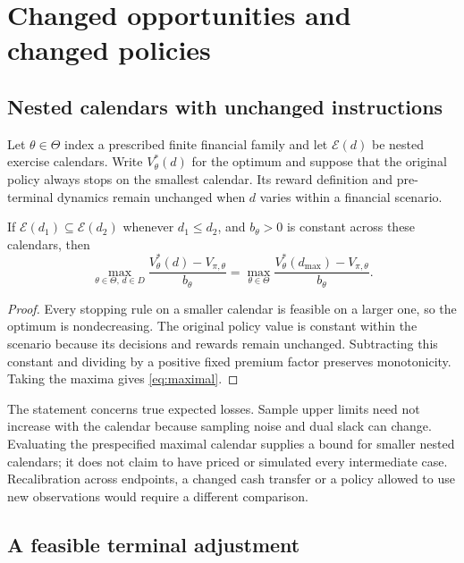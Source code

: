 \section{Changed opportunities and changed policies}

\subsection{Nested calendars with unchanged instructions}

Let $\theta\in\Theta$ index a prescribed finite financial family and let $\mathcal E(d)$ be nested exercise calendars. Write $V^*_\theta(d)$ for the optimum and suppose that the original policy always stops on the smallest calendar. Its reward definition and pre-terminal dynamics remain unchanged when $d$ varies within a financial scenario.

\begin{proposition}
If $\mathcal E(d_1)\subseteq\mathcal E(d_2)$ whenever $d_1\leq d_2$, and $b_\theta>0$ is constant across these calendars, then
\begin{equation}
 \max_{\theta\in\Theta,\,d\in D}
 \frac{V^*_\theta(d)-V_{\pi,\theta}}{b_\theta}
 =\max_{\theta\in\Theta}
 \frac{V^*_\theta(d_{\max})-V_{\pi,\theta}}{b_\theta}.
\label{eq:maximal}
\end{equation}
\end{proposition}
\begin{proof}
Every stopping rule on a smaller calendar is feasible on a larger one, so the optimum is nondecreasing. The original policy value is constant within the scenario because its decisions and rewards remain unchanged. Subtracting this constant and dividing by a positive fixed premium factor preserves monotonicity. Taking the maxima gives \eqref{eq:maximal}.
\end{proof}

The statement concerns true expected losses. Sample upper limits need not increase with the calendar because sampling noise and dual slack can change. Evaluating the prespecified maximal calendar supplies a bound for smaller nested calendars; it does not claim to have priced or simulated every intermediate case. Recalibration across endpoints, a changed cash transfer or a policy allowed to use new observations would require a different comparison.

\subsection{A feasible terminal adjustment}

